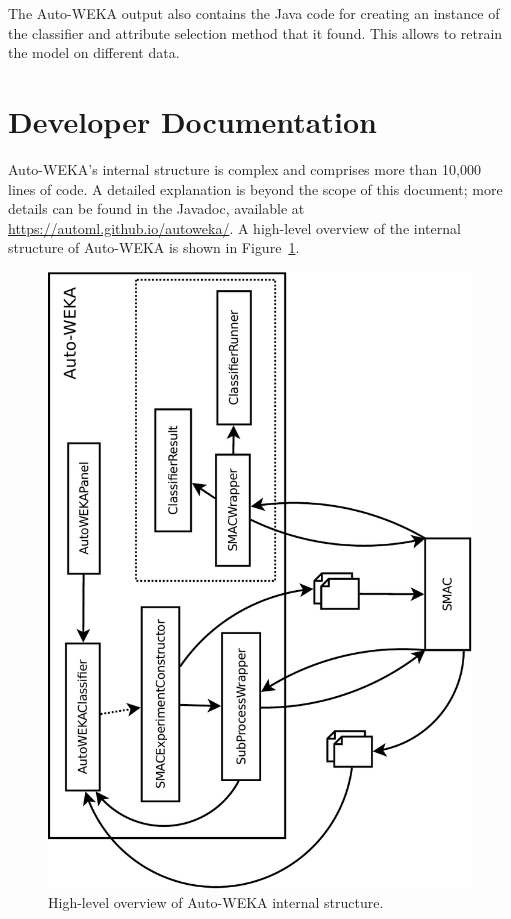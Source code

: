 \documentclass{article}
\begin{document}
The Auto-WEKA output also contains the Java code for creating an instance of the
classifier and attribute selection method that it found. This allows to retrain
the model on different data.

\section{Developer Documentation}

Auto-WEKA's internal structure is complex and comprises more than 10,000 lines
of code. A detailed explanation is beyond the scope of this document; more
details can be found in the Javadoc, available at
\url{https://automl.github.io/autoweka/}. A high-level overview of the internal
structure of Auto-WEKA is shown in Figure~\ref{fig:devel-overview}.

\begin{figure}[!ht]
\begin{center}
\includegraphics[angle=-90,width=\textwidth]{devel-overview-crop}
\caption{High-level overview of Auto-WEKA internal structure.}
\label{fig:devel-overview}
\end{center}
\end{figure}
\end{document}

